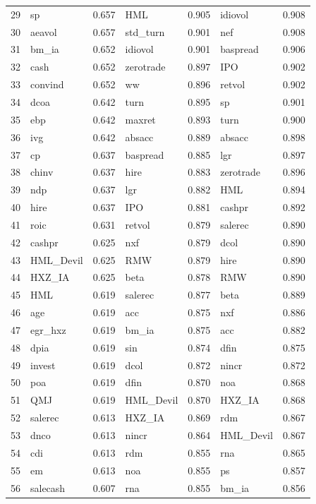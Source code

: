 \begin{footnotesize}
\begin{longtable}{r|lc|lc|lc}
  29 & sp & 0.657 & HML & 0.905 & idiovol & 0.908 \\ 
  30 & aeavol & 0.657 & std\_turn & 0.901 & nef & 0.908 \\ 
  31 & bm\_ia & 0.652 & idiovol & 0.901 & baspread & 0.906 \\ 
  32 & cash & 0.652 & zerotrade & 0.897 & IPO & 0.902 \\ 
  33 & convind & 0.652 & ww & 0.896 & retvol & 0.902 \\ 
  34 & dcoa & 0.642 & turn & 0.895 & sp & 0.901 \\ 
  35 & ebp & 0.642 & maxret & 0.893 & turn & 0.900 \\ 
  36 & ivg & 0.642 & absacc & 0.889 & absacc & 0.898 \\ 
  37 & cp & 0.637 & baspread & 0.885 & lgr & 0.897 \\ 
  38 & chinv & 0.637 & hire & 0.883 & zerotrade & 0.896 \\ 
  39 & ndp & 0.637 & lgr & 0.882 & HML & 0.894 \\ 
  40 & hire & 0.637 & IPO & 0.881 & cashpr & 0.892 \\ 
  41 & roic & 0.631 & retvol & 0.879 & salerec & 0.890 \\ 
  42 & cashpr & 0.625 & nxf & 0.879 & dcol & 0.890 \\ 
  43 & HML\_Devil & 0.625 & RMW & 0.879 & hire & 0.890 \\ 
  44 & HXZ\_IA & 0.625 & beta & 0.878 & RMW & 0.890 \\ 
  45 & HML & 0.619 & salerec & 0.877 & beta & 0.889 \\ 
  46 & age & 0.619 & acc & 0.875 & nxf & 0.886 \\ 
  47 & egr\_hxz & 0.619 & bm\_ia & 0.875 & acc & 0.882 \\ 
  48 & dpia & 0.619 & sin & 0.874 & dfin & 0.875 \\ 
  49 & invest & 0.619 & dcol & 0.872 & nincr & 0.872 \\ 
  50 & poa & 0.619 & dfin & 0.870 & noa & 0.868 \\ 
  51 & QMJ & 0.619 & HML\_Devil & 0.870 & HXZ\_IA & 0.868 \\ 
  52 & salerec & 0.613 & HXZ\_IA & 0.869 & rdm & 0.867 \\ 
  53 & dnco & 0.613 & nincr & 0.864 & HML\_Devil & 0.867 \\ 
  54 & cdi & 0.613 & rdm & 0.855 & rna & 0.865 \\ 
  55 & em & 0.613 & noa & 0.855 & ps & 0.857 \\ 
  56 & salecash & 0.607 & rna & 0.855 & bm\_ia & 0.856 \\ 

\end{longtable}
\end{footnotesize}
